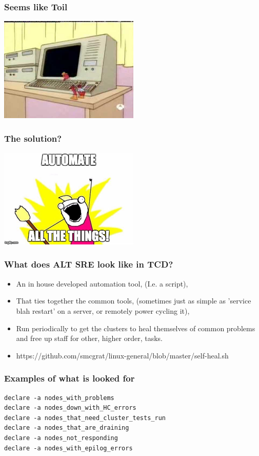 \documentclass{beamer}
\begin{document}
\begin{frame}
\frametitle{Seems like Toil}
    \begin{center}
     \includegraphics[width=0.5\textwidth]{imgs/bird.jpg}
     \end{center}
\end{frame}

\begin{frame}
\frametitle{The solution?}
    \begin{center}
     \includegraphics[width=0.5\textwidth]{imgs/automate.jpeg}
     \end{center}
\end{frame}

\begin{frame}
\frametitle{What does ALT SRE look like in TCD?}
\begin{itemize}
	\item An in house developed automation tool, (I.e. a script),
	\item That ties together the common tools, (sometimes just as simple as 'service blah restart' on a server, or remotely power cycling it), 
	\item Run periodically to get the clusters to heal themselves of common problems and free up staff for other, higher order, tasks.
	\item https://github.com/smcgrat/linux-general/blob/master/self-heal.sh
\end{itemize}
\end{frame}

\begin{frame}[fragile]
\frametitle{Examples of what is looked for}
\begin{verbatim}
declare -a nodes_with_problems
declare -a nodes_down_with_HC_errors
declare -a nodes_that_need_cluster_tests_run
declare -a nodes_that_are_draining
declare -a nodes_not_responding
declare -a nodes_with_epilog_errors
\end{verbatim}
\end{frame}
\end{document}
